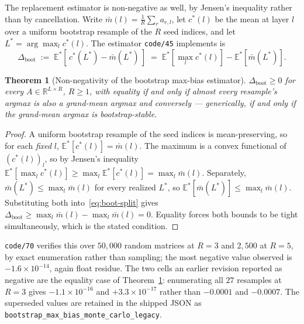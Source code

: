 \documentclass{article}
\newtheorem{theorem}{Theorem}
\begin{document}
The replacement estimator is non-negative as well, by Jensen's inequality
rather than by cancellation. Write $\bar m(l)=\tfrac1R\sum_r a_{r,l}$, let
$c^{*}(l)$ be the mean at layer $l$ over a uniform bootstrap resample of the
$R$ seed indices, and let $L^{*}=\arg\max_l c^{*}(l)$. The estimator
\texttt{code/45} implements is
\begin{equation}
\Delta_{\text{boot}}
\;:=\;\mathbb{E}^{*}\!\left[\,c^{*}(L^{*})-\bar m(L^{*})\,\right]
\;=\;\mathbb{E}^{*}\!\left[\max_l c^{*}(l)\right]-\mathbb{E}^{*}\!\left[\bar m(L^{*})\right].
\label{eq:boot-split}
\end{equation}

\begin{theorem}[Non-negativity of the bootstrap max-bias estimator]
\label{thm:boot-nonneg}
$\Delta_{\text{boot}}\ge0$ for every $A\in\mathbb{R}^{L\times R}$, $R\ge1$,
with equality if and only if almost every resample's argmax is also a
grand-mean argmax and conversely --- generically, if and only if the
grand-mean argmax is bootstrap-stable.
\end{theorem}

\begin{proof}
A uniform bootstrap resample of the seed indices is mean-preserving, so for
each \emph{fixed} $l$, $\mathbb{E}^{*}[c^{*}(l)]=\bar m(l)$. The maximum is a
convex functional of $(c^{*}(l))_l$, so by Jensen's inequality
$\mathbb{E}^{*}\!\left[\max_l c^{*}(l)\right]\ge\max_l \mathbb{E}^{*}[c^{*}(l)]
=\max_l \bar m(l)$. Separately, $\bar m(L^{*})\le\max_l \bar m(l)$ for every
realized $L^{*}$, so $\mathbb{E}^{*}[\bar m(L^{*})]\le\max_l \bar m(l)$.
Substituting both into~\eqref{eq:boot-split} gives
$\Delta_{\text{boot}}\ge\max_l\bar m(l)-\max_l\bar m(l)=0$. Equality forces
both bounds to be tight simultaneously, which is the stated condition.
\end{proof}

\texttt{code/70} verifies this over $50{,}000$ random matrices at $R=3$ and
$2{,}500$ at $R=5$, by exact enumeration rather than sampling; the most
negative value observed is $-1.6\times10^{-14}$, again float residue. The two
cells an earlier revision reported as negative are the equality case of
Theorem~\ref{thm:boot-nonneg}: enumerating all $27$ resamples at $R=3$ gives
$-1.1\times10^{-16}$ and $+3.3\times10^{-17}$ rather than $-0.0001$ and
$-0.0007$. The superseded values are retained in the shipped JSON as
\texttt{bootstrap\_max\_bias\_monte\_carlo\_legacy}.
\end{document}
